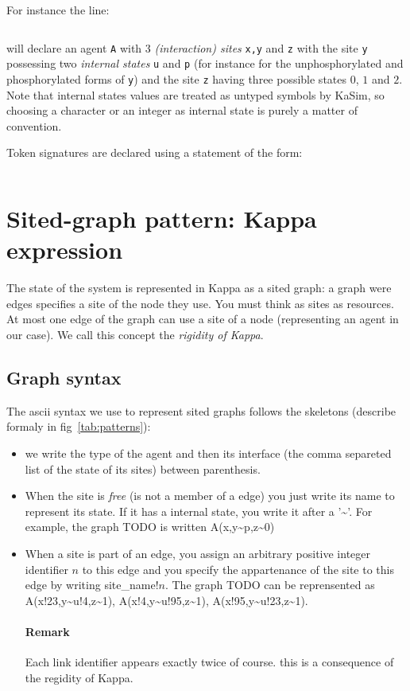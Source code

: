 \documentclass[11pt]{book}
\def\KaSim{\textsf{KaSim}}
\def\intstate{\textasciitilde}
\def\ttt#1{\texttt{#1}}
\newcommand{\Remark}{\paragraph{Remark}}
\begin{document}
For instance the line:
\begin{lstlisting}[language=kappa]
%agent: A(x,y~u~p,z~0~1~2) # Signature of agent A
\end{lstlisting}
will declare an agent \ttt{A} with 3 \emph{(interaction) sites}
\ttt{x,y} and \ttt{z} with the site \ttt{y} possessing two
\emph{internal states} \ttt{u} and \ttt{p} (for
instance for the unphosphorylated and phosphorylated forms of \ttt{y})
and the site \ttt{z} having three possible states $0$, $1$ and
$2$. Note that internal states values are
treated as untyped symbols by \KaSim, so choosing a character or an
integer as internal state is purely a matter of convention.

Token signatures are declared using a statement
of the form:
\begin{lstlisting}[language=kappa]
%token: ca+ # Signature of calcium token
\end{lstlisting}

\section{Sited-graph pattern: Kappa expression}

The state of the system is represented in Kappa as a sited graph: a
graph were edges specifies a site of the node they use. You must think
as sites as resources. At most one edge of the graph can use a site of
a node (representing an agent in our case). We call this concept the
\emph{rigidity of Kappa}.

\subsection{Graph syntax}
The ascii syntax we use to represent sited graphs follows the
skeletons (describe formaly in fig~\ref{tab:patterns}):
\begin{itemize}
\item we write the type of the agent and then its interface (the comma
  separeted list of the state of its sites) between parenthesis.
\item When the site is \emph{free} (is not a member of a edge) you
  just write its name to represent its state. If it has a internal
  state, you write it after a '\intstate'. For example, the graph
  TODO is written A(x,y\intstate{}p,z\intstate{}0)
\item When a site is part of an edge, you assign an arbitrary positive
  integer identifier $n$ to this edge and you specify the appartenance
  of the site to this edge by writing site\_name$!n$. The graph TODO
  can be reprensented as A(x!23,y\intstate{}u!4,z\intstate{}1),
  A(x!4,y\intstate{}u!95,z\intstate{}1),
  A(x!95,y\intstate{}u!23,z\intstate{}1).

  \Remark{Each link identifier appears exactly twice of course. this is a
  consequence of the regidity of Kappa.}
\end{itemize}
\end{document}

